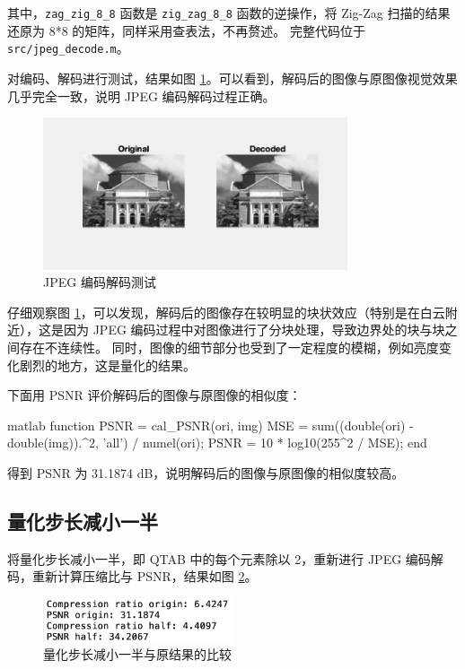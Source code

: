 \documentclass[a4paper]{article}  %
\begin{document}
其中，\texttt{zag\_zig\_8\_8} 函数是 \texttt{zig\_zag\_8\_8} 函数的逆操作，将 Zig-Zag 扫描的结果还原为 8*8 的矩阵，同样采用查表法，不再赘述。
完整代码位于 \texttt{src/jpeg\_decode.m}。

对编码、解码进行测试，结果如图 \ref{fig:2_11_decode}。可以看到，解码后的图像与原图像视觉效果几乎完全一致，说明 JPEG 编码解码过程正确。

\begin{figure}[ht]
    \centering
    \includegraphics[width=0.8\textwidth]{asserts/2_11_decode.png}
    \caption{
        JPEG 编码解码测试
    }\label{fig:2_11_decode}
\end{figure}

仔细观察图 \ref{fig:2_11_decode}，可以发现，解码后的图像存在较明显的块状效应（特别是在白云附近），这是因为 JPEG 编码过程中对图像进行了分块处理，导致边界处的块与块之间存在不连续性。
同时，图像的细节部分也受到了一定程度的模糊，例如亮度变化剧烈的地方，这是量化的结果。

下面用 PSNR 评价解码后的图像与原图像的相似度：

\begin{codeblock}{matlab}
function PSNR = cal_PSNR(ori, img)
    MSE = sum((double(ori) - double(img)).^2, 'all') / numel(ori);
    PSNR = 10 * log10(255^2 / MSE);
end
\end{codeblock}

得到 PSNR 为 31.1874 dB，说明解码后的图像与原图像的相似度较高。

\subsection{量化步长减小一半}

将量化步长减小一半，即 QTAB 中的每个元素除以 2，重新进行 JPEG 编码解码，重新计算压缩比与 PSNR，结果如图 \ref{fig:2_12_res}。

\begin{figure}[ht]
    \centering
    \includegraphics[width=0.5\textwidth]{asserts/2_12_res.png}
    \caption{
        量化步长减小一半与原结果的比较
    }\label{fig:2_12_res}
\end{figure}
\end{document}
